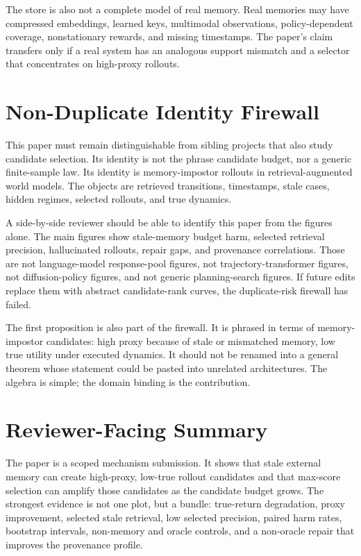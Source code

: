\documentclass{article}
\begin{document}
The store is also not a complete model of real memory. Real memories may have
compressed embeddings, learned keys, multimodal observations, policy-dependent
coverage, nonstationary rewards, and missing timestamps. The paper's claim
transfers only if a real system has an analogous support mismatch and a
selector that concentrates on high-proxy rollouts.

\section{Non-Duplicate Identity Firewall}
\label{app:identity-firewall}

This paper must remain distinguishable from sibling projects that also study
candidate selection. Its identity is not the phrase candidate budget, nor a
generic finite-sample law. Its identity is memory-impostor rollouts in
retrieval-augmented world models. The objects are retrieved transitions,
timestamps, stale cases, hidden regimes, selected rollouts, and true dynamics.

A side-by-side reviewer should be able to identify this paper from the figures
alone. The main figures show stale-memory budget harm, selected retrieval
precision, hallucinated rollouts, repair gaps, and provenance correlations.
Those are not language-model response-pool figures, not trajectory-transformer
figures, not diffusion-policy figures, and not generic planning-search
figures. If future edits replace them with abstract candidate-rank curves, the
duplicate-risk firewall has failed.

The first proposition is also part of the firewall. It is phrased in terms of
memory-impostor candidates: high proxy because of stale or mismatched memory,
low true utility under executed dynamics. It should not be renamed into a
general theorem whose statement could be pasted into unrelated architectures.
The algebra is simple; the domain binding is the contribution.

\section{Reviewer-Facing Summary}
\label{app:reviewer-summary}

The paper is a scoped mechanism submission. It shows that stale external
memory can create high-proxy, low-true rollout candidates and that max-score
selection can amplify those candidates as the candidate budget grows. The
strongest evidence is not one plot, but a bundle: true-return degradation,
proxy improvement, selected stale retrieval, low selected precision, paired
harm rates, bootstrap intervals, non-memory and oracle controls, and a
non-oracle repair that improves the provenance profile.
\end{document}
